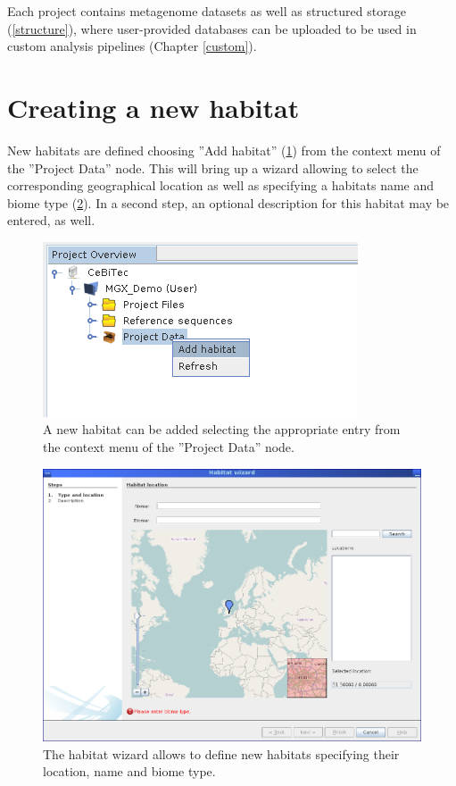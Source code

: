 Each project contains metagenome datasets as well as structured storage (\ref{structure}), where user-provided
databases can be uploaded to be used in custom analysis pipelines (Chapter \ref{custom}).

\section{Creating a new habitat}

New habitats are defined choosing ''Add habitat'' (\ref{addhabitat}) from the context menu of the ''Project Data''
node. This will bring up a wizard allowing to select the corresponding geographical location as well as
specifying a habitats name and biome type (\ref{habwiz}). In a second step, an optional description for this
habitat may be entered, as well.

\begin{figure}[H]
\centering
\includegraphics[width=.4\textwidth]{img/mgx/addhabitat}
\caption[Habitat creation]{A new habitat can be added selecting the appropriate entry from the context
menu of the ''Project Data'' node.}
\label{addhabitat}
\end{figure}

\begin{figure}[H]
\centering
\includegraphics[width=.8\textwidth]{img/mgx/habwizard}
\caption[Habitat wizard]{The habitat wizard allows to define new habitats specifying their location, name and
biome type.}
\label{habwiz}
\end{figure}

